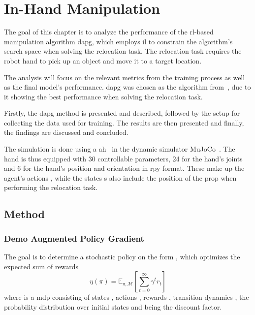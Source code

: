 \chapter{In-Hand Manipulation}\label{ch:3-in-hand-manipulation}

The goal of this chapter is to analyze the performance of the \gls{rl}-based manipulation algorithm \gls{dapg}, which employs \gls{il} to constrain the algorithm's search space when solving the relocation task. The relocation task requires the robot hand to pick up an object and move it to a target location.\medskip 

The analysis will focus on the relevant metrics from the training process as well as the final model's performance. \gls{dapg} was chosen as the algorithm from~\cite{dexmv:-imitation-learning-for-dexterous-manipulation-from-human-videos}, due to it showing the best performance when solving the relocation task. \medskip

Firstly, the \gls{dapg} method is presented and described, followed by the setup for collecting the data used for training. The results are then presented and finally, the findings are discussed and concluded.\medskip

The simulation is done using a \gls{ah}~\cite{learning-complex-dexterous-manipulation-with-deep-reinforcement-learning-and-demonstrations} in the dynamic simulator MuJoCo~\cite{todorov2012mujoco}. The hand is thus equipped with \num{30} controllable parameters, \num{24} for the hand's joints and \num{6} for the hand's position  and orientation  in \gls{rpy} format. These make up the agent's actions , while the states {s} also include the position of the prop when performing the relocation task.

\section{Method}\label{sec:3-in-hand-manipulation-method}

\subsection{Demo Augmented Policy Gradient}\label{dapg}

The goal is to determine a stochastic policy on the form , which optimizes the expected sum of rewards
%
\begin{equation}
	\eta(\pi)=\mathbb{E}_{\pi,\mathcal{M}} \left[ \sum^\infty_{t=0} \gamma^t r_t \right]
\end{equation}
where  is a \gls{mdp} consisting of states , actions , rewards , transition dynamics ,  the probability distribution over initial states and \mvar{\gamma\in[0,1]} being the discount factor.\medskip

